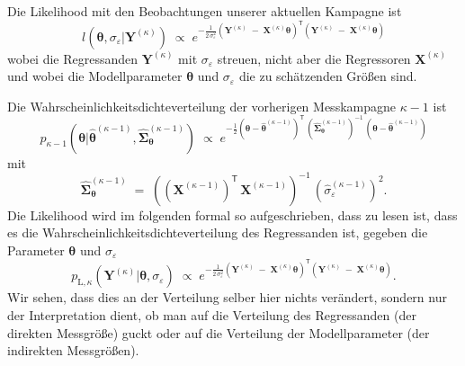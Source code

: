 Die Likelihood mit den Beobachtungen unserer aktuellen Kampagne ist
\begin{equation}
l(\boldsymbol{\theta}, \sigma_{\varepsilon} | \mathbf{Y}^{(\kappa)}) \; \propto \;
e^{-\frac{1}{2 \, \sigma_{\varepsilon}^2}
	\left(\mathbf{Y}^{(\kappa)} \; - \;  \mathbf{X}^{(\kappa)} \boldsymbol{\theta} \right)^\mathsf{T}
	\left(\mathbf{Y}^{(\kappa)} \; - \;  \mathbf{X}^{(\kappa)} \boldsymbol{\theta} \right)}
\end{equation}
wobei die Regressanden $\mathbf{Y}^{(\kappa)}$ mit $\sigma_{\varepsilon}$ streuen, nicht
aber die Regressoren $\mathbf{X}^{(\kappa)}$ und wobei die Modellparameter
$\boldsymbol{\theta}$ und $\sigma_{\varepsilon}$ die zu schätzenden Größen sind.

Die Wahrscheinlichkeitsdichteverteilung der vorherigen Messkampagne $\kappa-1$
ist
\begin{equation}
p_{\kappa-1}(\boldsymbol{\theta} | \boldsymbol{\hat \theta}^{(\kappa-1)},
\boldsymbol{\hat \Sigma}^{(\kappa-1)}_{\boldsymbol{\theta}})
\; \propto \; e^{-\frac{1}{2}
	\left(\boldsymbol{\theta} - \boldsymbol{\hat \theta}^{(\kappa-1)} \right)^\mathsf{T} \,
	\left(\boldsymbol{\hat \Sigma}_{\boldsymbol{\theta}}^{(\kappa-1)}\right)^{-1} \, \left(\boldsymbol{\theta} - \boldsymbol{\hat \theta}^{(\kappa-1)} \right)}
\label{priorRegression}
\end{equation}
mit
$$
\boldsymbol{\hat \Sigma}_{\boldsymbol{\theta}}^{(\kappa-1)} \; = \;
\left( \left(\mathbf{X}^{(\kappa-1)}\right)^\mathsf{T} \, \mathbf{X}^{(\kappa-1)} \right)^{-1}
\, \left(\hat \sigma_{\varepsilon}^{(\kappa-1)}\right)^2 .
$$
Die Likelihood wird im folgenden formal so aufgeschrieben, dass zu lesen ist, dass es die
Wahrscheinlichkeitsdichteverteilung des Regressanden ist, gegeben die Parameter
$\boldsymbol{\theta}$ und $\sigma_{\varepsilon}$
\begin{equation}
p_{\mathrm{L},\kappa} (\mathbf{Y}^{(\kappa)} | \boldsymbol{\theta}, \sigma_{\varepsilon}) \; \propto \;
e^{-\frac{1}{2 \, \sigma_{\varepsilon}^2}
	\left(\mathbf{Y}^{(\kappa)} \; - \;  \mathbf{X}^{(\kappa)} \boldsymbol{\theta} \right)^\mathsf{T}
	\left(\mathbf{Y}^{(\kappa)} \; - \;  \mathbf{X}^{(\kappa)} \boldsymbol{\theta} \right)} .
\end{equation}
Wir sehen, dass dies an der Verteilung selber hier nichts verändert, sondern nur der
Interpretation dient, ob man auf die Verteilung des Regressanden (der direkten
Messgröße) guckt oder auf die Verteilung der Modellparameter (der indirekten Messgrößen).

